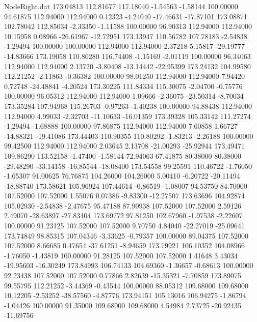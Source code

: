 \begin{filecontents}{NodeRight.dat}
 173.04813  112.81677  117.18040    -1.54563   -1.58144  100.00000   94.61875  112.94000  112.94000    0.12323   -4.24040  -17.46631  -17.87101
 173.08871  102.78042  112.85034    -2.33350   -1.11588  100.00000   96.90313  112.94000  112.94000   10.15958    0.08966  -26.61967  -12.72951
 173.13947  110.56782  107.78183    -2.54838   -1.29494  100.00000  100.00000  112.94000  112.94000    2.37218    5.15817  -29.19777  -14.83666
 173.19058  110.80280  116.74408    -1.15169   -2.01119  100.00000   96.34063  112.94000  112.94000    2.13720   -3.80408  -13.14442  -22.95399
 173.24132  104.99580  112.21252    -2.11863   -0.36382  100.00000   98.01250  112.94000  112.94000    7.94420    0.72748  -24.48841   -4.20524
 173.30225  111.84334  115.30075    -2.04700   -0.75776  100.00000   96.05312  112.94000  112.94000    1.09666   -2.36075  -23.50314   -8.70034
 173.35284  107.94968  115.26703    -0.97263   -1.40238  100.00000   94.88438  112.94000  112.94000    4.99033   -2.32703  -11.10633  -16.01359
 173.39328  105.33142  111.27274    -1.29494   -1.68888  100.00000   97.86875  112.94000  112.94000    7.60858    1.66727  -14.88321  -19.41086
 173.44403  110.90355  110.80292    -1.83213   -2.26188  100.00000   99.42500  112.94000  112.94000    2.03645    2.13708  -21.00293  -25.92944
 173.49471  109.86290  113.52158    -1.47400   -1.58144   72.94063   67.41875   80.38000   80.38000  -29.48290  -33.14158  -16.85544  -18.08400
 173.54558   99.25591  110.46722    -1.76050   -1.65307   91.00625   76.76875  104.26000  104.26000    5.00410   -6.20722  -20.11494  -18.88740
 173.58621  105.96924  107.44614    -0.86519   -1.08007   94.53750   84.70000  107.52000  107.52000    1.55076    0.07386   -9.83300  -12.27507
 173.63696  104.92874  105.02930    -2.54838   -2.47675   95.47188   87.90938  107.52000  107.52000    2.59126    2.49070  -28.63897  -27.83404
 173.69772   97.81250  102.67960    -1.97538   -2.22607  100.00000   91.23125  107.52000  107.52000    9.70750    4.84040  -22.27019  -25.09641
 173.74849   98.85315  107.04346    -3.33625   -0.79357  100.00000   89.04375  107.52000  107.52000    8.66685    0.47654  -37.61251   -8.94659
 173.79921  106.10352  104.08966    -1.76050   -1.43819  100.00000   91.28125  107.52000  107.52000    1.41648    3.43034  -19.95603  -16.30249
 173.84993  106.74133  104.69360    -1.36657   -0.68613  100.00000   92.23438  107.52000  107.52000    0.77866    2.82639  -15.35321   -7.70859
 173.89075   99.55795  112.21252    -3.44369   -0.43544  100.00000   88.05312  109.68000  109.68000   10.12205   -2.53252  -38.57560   -4.87776
 173.94151  105.13016  106.94275    -1.86794   -1.04426  100.00000   91.35000  109.68000  109.68000    4.54984    2.73725  -20.92435  -11.69756

\end{filecontents}

